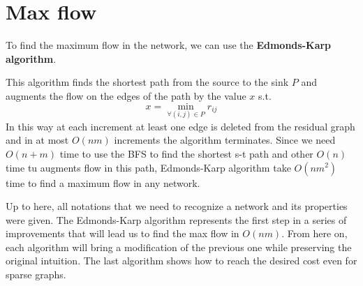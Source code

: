 \section{Max flow}
To find the maximum flow in the network, we can use the \textbf{Edmonds-Karp algorithm}.

This algorithm finds the shortest path from the source to the sink $P$ and augments the flow on the edges of the path by the value $x$ s.t.
\[x = \min_{\forall (i,j)\in P} r_{ij}\]
In this way at each increment at least one edge is deleted from the residual graph and in at most $O(nm)$ increments the algorithm terminates.
Since we need $O(n+m)$ time to use the BFS to find the shortest s-t path and other $O(n)$ time tu augments flow in this path, Edmonds-Karp algorithm take $O(nm^2)$ time to find a maximum flow in any network.

Up to here, all notations that we need to recognize a network and its properties were given. The Edmonds-Karp algorithm represents the first step in a series of improvements that will lead us to find the max flow in $O(nm)$. From here on, each algorithm will bring a modification of the previous one while preserving the original intuition. The last algorithm shows how to reach the desired cost even for sparse graphs.

\cleardoublepage
